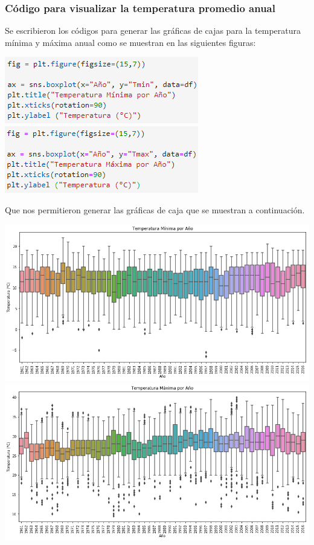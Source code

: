 \documentclass{article}
\begin{document}
\subsubsection{Código para visualizar la temperatura promedio anual}
\noindent Se escribieron los códigos para generar las gráficas de cajas para la temperatura mínima y máxima anual como se muestran en las siguientes figuras:
\begin{center}
    \includegraphics[scale = 0.9]{CTminBoxY.png}
    \includegraphics[scale = 0.9]{CTmaxBoxY.png}
\end{center}
\clearpage
Que nos permitieron generar las gráficas de caja que se muestran a continuación.
\begin{center}
    \includegraphics[scale = 0.5]{TminBoxY.png}
    \includegraphics[scale = 0.5]{TmaxBoxY.png}
\end{center}
\end{document}
